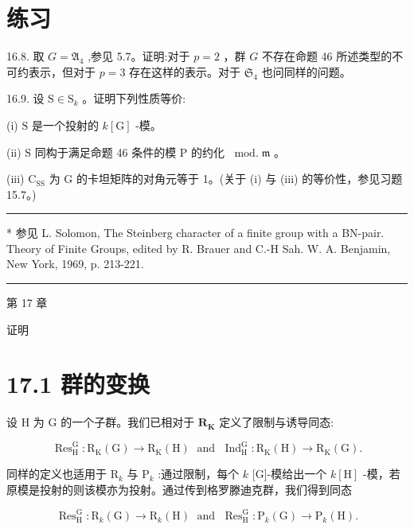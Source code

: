 \documentclass[10pt]{article}
\newcommand{\HRule}{\begin{center}\rule{0.9\linewidth}{0.2mm}\end{center}}
\begin{document}
\section*{练习}

16.8. 取 \(G = {\mathfrak{A}}_{4}\) ,参见 5.7。证明:对于 \(p = 2\) ，群 \(G\) 不存在命题 46 所述类型的不可约表示，但对于 \(p = 3\) 存在这样的表示。对于 \({\mathfrak{S}}_{4}\) 也问同样的问题。

16.9. 设 \(\mathrm{S} \in  {\mathrm{S}}_{k}\) 。证明下列性质等价:

(i) \(\mathrm{S}\) 是一个投射的 \(k\left\lbrack  \mathrm{G}\right\rbrack\) -模。

(ii) \(\mathrm{S}\) 同构于满足命题 46 条件的模 \(\mathrm{P}\) 的约化 \({\;\operatorname{mod.}}\mathfrak{m}\) 。

(iii) \({\mathrm{C}}_{\mathrm{{SS}}}\) 为 \(\mathrm{G}\) 的卡坦矩阵的对角元等于 1。(关于 (i) 与 (iii) 的等价性，参见习题 15.7。)

\HRule

* 参见 L. Solomon, The Steinberg character of a finite group with a BN-pair. Theory of Finite Groups, edited by R. Brauer and C.-H Sah. W. A. Benjamin, New York, 1969, p. 213-221.

\HRule

第 17 章

证明

\section*{17.1 群的变换}

设 \(\mathrm{H}\) 为 \(\mathrm{G}\) 的一个子群。我们已相对于 \({\mathbf{R}}_{\mathbf{K}}\) 定义了限制与诱导同态:

\[
{\operatorname{Res}}_{\mathrm{H}}^{\mathrm{G}} : {\mathrm{R}}_{\mathrm{K}}\left( \mathrm{G}\right)  \rightarrow  {\mathrm{R}}_{\mathrm{K}}\left( \mathrm{H}\right) \;\text{ and }\;{\operatorname{Ind}}_{\mathrm{H}}^{\mathrm{G}} : {\mathrm{R}}_{\mathrm{K}}\left( \mathrm{H}\right)  \rightarrow  {\mathrm{R}}_{\mathrm{K}}\left( \mathrm{G}\right) .
\]

同样的定义也适用于 \({\mathrm{R}}_{k}\) 与 \({\mathrm{P}}_{k}\) :通过限制，每个 \(k\) [G]-模给出一个 \(k\left\lbrack  \mathrm{H}\right\rbrack\) -模，若原模是投射的则该模亦为投射。通过传到格罗滕迪克群，我们得到同态

\[
{\operatorname{Res}}_{\mathrm{H}}^{\mathrm{G}} : {\mathrm{R}}_{k}\left( \mathrm{G}\right)  \rightarrow  {\mathrm{R}}_{k}\left( \mathrm{H}\right) \;\text{ and }\;{\operatorname{Res}}_{\mathrm{H}}^{\mathrm{G}} : {\mathrm{P}}_{k}\left( \mathrm{G}\right)  \rightarrow  {\mathrm{P}}_{k}\left( \mathrm{H}\right) .
\]
\end{document}
